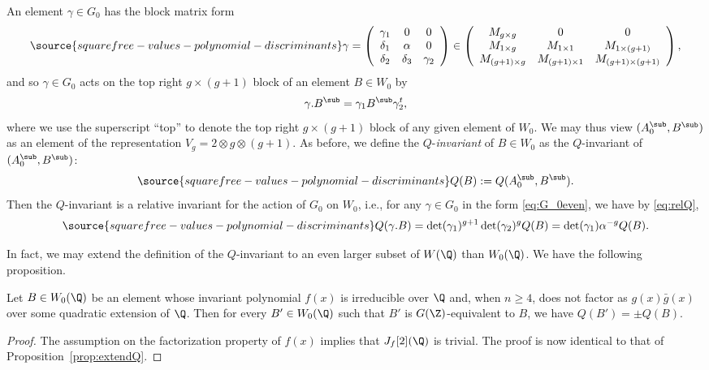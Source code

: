 An element $\gamma\in G_0$ has the block matrix form
\begin{equation}\label{eq:G_0even}
\source{squarefree-values-polynomial-discriminants}
\gamma=\left(\begin{array}{ccc}\gamma_1 & 0 & 0\\ \delta_1 & \alpha & 0\\ \delta_2 & \delta_3 & \gamma_2
\end{array}\right)\in\left(\begin{array}{ccc}M_{g\times g} & 0 & 0\\ M_{1\times g} & M_{1\times 1} & M_{1\times (g+1)}\\ M_{(g+1)\times g} & M_{(g+1)\times 1} & M_{(g+1)\times (g+1)}
\end{array}\right),
\end{equation}
and so $\gamma\in G_0$ acts on the top right $g\times (g+1)$ block
of an element $B\in W_0$ by
$$\gamma.B^\sub = \gamma_1B^\sub\gamma_2^t,$$ where we use the
superscript ``top'' to denote the top right $g\times (g+1)$ block of
any given element of $W_0$. We may thus view $(A_0^\sub,B^\sub)$ as an
element of the representation $V_g=2\otimes g\otimes (g+1)$. As
before, we define the $Q$-{\it invariant} of $B\in W_0$ as the
$Q$-invariant of $(A_0^\sub,B^\sub)$:
\begin{equation}\label{eqQBeven}
\source{squarefree-values-polynomial-discriminants}
Q(B):=Q(A_0^\sub,B^\sub).
\end{equation}
Then the $Q$-invariant is a relative invariant for the action of $G_0$ on $W_0$, i.e.,
for any $\gamma\in G_0$ in the form \eqref{eq:G_0even}, we have by \eqref{eq:relQ},
\begin{equation}\label{eq:weightG_0even}
\source{squarefree-values-polynomial-discriminants}
Q(\gamma.B) = \det(\gamma_1)^{g+1}\det(\gamma_2)^gQ(B) =
\det(\gamma_1)\alpha^{-g}Q(B).
\end{equation}

In fact, we may extend the definition of the
$Q$-invariant to an even larger subset of $W(\Q)$ than $W_0(\Q)$.
We have the following proposition.

\begin{proposition}
\notready\label{prop:extendQeven}
Let $B\in W_0(\Q)$ be an element whose invariant polynomial $f(x)$ is
irreducible over $\Q$ and, when $n\geq 4$, does not factor as $g(x)\bar{g}(x)$ over some quadratic extension of $\Q$. Then for every $B'\in W_0(\Q)$ such that $B'$ is $G(\Z)$-equivalent to $B$, we have
$Q(B')=\pm Q(B)$.
\end{proposition}
\begin{proof}
The assumption on the factorization property of $f(x)$ implies that $J_f[2](\Q)$ is trivial.
The proof is now identical to that of Proposition~\ref{prop:extendQ}.
\end{proof}

